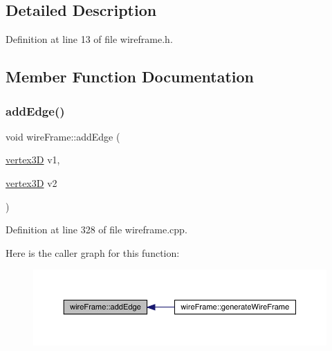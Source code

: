 \subsection{Detailed Description}


Definition at line 13 of file wireframe.\+h.



\subsection{Member Function Documentation}
\mbox{\label{classwire_frame_ac743b6520445f5e1e90a760847d47666}} 
\subsubsection{\texorpdfstring{add\+Edge()}{addEdge()}\hspace{0.1cm}{\footnotesize\ttfamily [1/2]}}
{\footnotesize\ttfamily void wire\+Frame\+::add\+Edge (\begin{DoxyParamCaption}\item[{\mbox{\hyperlink{structvertex3_d}{vertex3D}}}]{v1,  }\item[{\mbox{\hyperlink{structvertex3_d}{vertex3D}}}]{v2 }\end{DoxyParamCaption})}



Definition at line 328 of file wireframe.\+cpp.

Here is the caller graph for this function\+:
\nopagebreak
\begin{figure}[H]
\begin{center}
\leavevmode
\includegraphics[width=350pt]{classwire_frame_ac743b6520445f5e1e90a760847d47666_icgraph}
\end{center}
\end{figure}
\mbox{\label{classwire_frame_a63d72eec6ac26bb6d07d0662a936070a}} 
